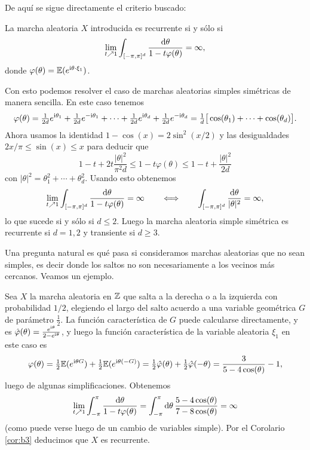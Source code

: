 De aquí se sigue directamente el criterio buscado:

\begin{cor}\label{cor:b3}
La marcha aleatoria $X$ introducida es recurrente si y sólo si
\[\lim_{t\nearrow1}\int_{[-\pi,\pi]^d}\frac{\mathrm{d}\theta}{1-t\varphi(\theta)}=\infty,\]
donde $\varphi(\theta)=\mathbb{E}(e^{{\rm i} \theta\cdot \xi_1})$.
\end{cor}

Con esto podemos resolver el caso de marchas aleatorias simples simétricas de manera sencilla.
En este caso tenemos
\[\varphi(\theta)=\tfrac1{2d}e^{{\rm i}\theta_1}+\tfrac1{2d}e^{-{\rm i}\theta_1}+\dotsm+\tfrac1{2d}e^{{\rm i}\theta_d}+\tfrac1{2d}e^{-{\rm i}\theta_d}=\tfrac{1}{d}\big[\cos(\theta_1)+\dotsm+\cos(\theta_d)\big].\]
Ahora usamos la identidad $1-\cos(x)=2\sin^2(x/2)$ y las desigualdades $2x/\pi\leq\sin(x)\leq x$ para deducir que 
\[1-t+2t\frac{|\theta|^2}{\pi^2 d}\leq1-t\varphi(\theta)\leq 1-t+\frac{|\theta|^2}{2d}\]
con $|\theta|^2=\theta_1^2+\dotsm+\theta_d^2$.
Usando esto obtenemos
\[\lim_{t\nearrow1}\int_{[-\pi,\pi]^d}\frac{\mathrm{d}\theta}{1-t\varphi(\theta)}=\infty\qquad\Longleftrightarrow\qquad\int_{[-\pi,\pi]^d}\frac{\mathrm{d}\theta}{|\theta|^2}=\infty,\]
lo que sucede si y sólo si $d\leq2$.
Luego la marcha aleatoria simple simétrica es recurrente si $d=1,2$ y transiente si $d\geq3$.

\smallskip

Una pregunta natural es qué pasa si consideramos marchas aleatorias que no sean simples, es decir donde los saltos no son necesariamente a los vecinos más cercanos.
Veamos un ejemplo.

\begin{ex}
Sea $X$ la marcha aleatoria en $\mathbb{Z}$ que salta a la derecha o a la izquierda con probabilidad $1/2$, elegiendo el largo del salto acuerdo a una variable geométrica $G$ de parámetro $\frac12$.
La función característica de $G$ puede calcularse directamente, y es $\hat\varphi(\theta)=\frac{e^{{\rm i}\theta}}{2-e^{{\rm i}\theta}}$, y luego la función característica de la variable aleatoria $\xi_1$ en este caso es
\[\varphi(\theta)=\tfrac12\mathbb{E}(e^{{\rm i}\theta G})+\tfrac12\mathbb{E}(e^{{\rm i}\theta(-G)})=\tfrac12\hat\varphi(\theta)+\tfrac12\hat\varphi(-\theta)=\frac{3}{5-4\cos(\theta)}-1,\]
luego de algunas simplificaciones.
Obtenemos
\[\lim_{t\nearrow1}\int_{-\pi}^\pi\frac{\mathrm{d}\theta}{1-t\varphi(\theta)}=\int_{-\pi}^\pi\mathrm{d}\theta\,\frac{5-4\cos(\theta)}{7-8\cos(\theta)}=\infty\]
(como puede verse luego de un cambio de variables simple).
Por el Corolario \ref{cor:b3} deducimos que $X$ es recurrente.
\end{ex}

